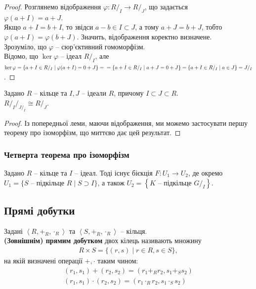 \documentclass{math_library}
\begin{document}
\begin{proof}
Розглянемо відображення $\varphi \colon R/_I \to R/_J$, що задається\\
$\varphi(a+I) = a+J$.\\
Якщо $a+I = b+I$, то звідси $a-b \in I \subset J$, а тому $a+J = b+J$, тобто $\varphi(a+I) = \varphi(b+J)$. Значить, відображення коректно визначене.\\
Зрозуміло, що $\varphi$ -- сюр'єктивний гомоморфізм. \\
Відомо, що $\ker \varphi$ -- ідеал $R/_I$, але\\
$\ker \varphi = \{a + I \in R/_I \mid \varphi(a+I) = 0+J\} = \\
= \{a+I \in R/_I \mid a+J = 0+J\} = \{a+I \in R/_I \mid a \in J\} = J/_I$.
\end{proof}

\begin{theorem}
Задано $R$ -- кільце та $I,J$ -- ідеали $R$, причому $I \subset J \subset R$.\\
${R/_I}/_{J/_I} \cong R/_J$.
\end{theorem}

\begin{proof}
Із попередньої леми, маючи відображення, ми можемо застосувати першу теорему про ізоморфізм, що миттєво дає цей результат.
\end{proof}

\subsubsection{Четверта теорема про ізоморфізм}
\begin{theorem}
Задано $R$ -- кільце та $I$ -- ідеал. Тоді існує бієкція $F \colon U_1 \to U_2$, де окремо $U_1 = \{ S \text{ -- підкільце } R \mid S \supset I\}$, а також $U_2 = \left\{ K \text{ -- підкільце } G/_I\right\}$.
\end{theorem}

\subsection{Прямі добутки}
\begin{definition}
Задані $\left<R, +_R, \cdot_R \right>$ та $\left<S, +_R, \cdot_R \right>$ -- кільця.\\
\textbf{(Зовнішнім) прямим добутком} двох кілець називають множину
\begin{align*}
R \times S = \{(r,s) \mid r \in R, s \in S\},
\end{align*}
на якій визначені операції $+,\cdot$ таким чином:
\begin{align*}
(r_1,s_1) + (r_2,s_2) = (r_1+_R r_2, s_1 +_S s_2) \\
(r_1,s_1) \cdot (r_2,s_2) = (r_1 \cdot_R r_2, s_1 \cdot_S s_2)
\end{align*}
\end{definition}
\end{document}
